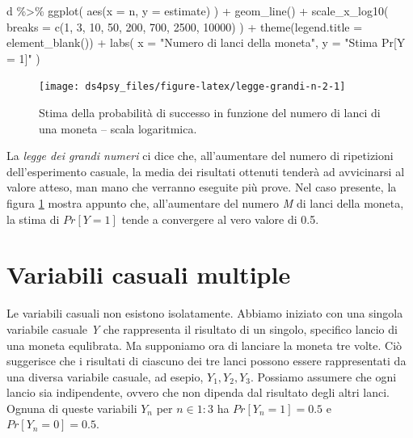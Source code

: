 \documentclass[
  11pt,
]{krantz}
\makeatletter
\newenvironment{Shaded}{\begin{snugshade}}{\end{snugshade}}
\newcommand{\AttributeTok}[1]{\textcolor[rgb]{0.61,0.61,0.61}{#1}}
\newcommand{\DecValTok}[1]{\textcolor[rgb]{0.06,0.06,0.06}{#1}}
\newcommand{\FunctionTok}[1]{\textcolor[rgb]{0,0,0}{#1}}
\newcommand{\NormalTok}[1]{#1}
\newcommand{\SpecialCharTok}[1]{\textcolor[rgb]{0,0,0}{#1}}
\newcommand{\StringTok}[1]{\textcolor[rgb]{0.5,0.5,0.5}{#1}}
\newenvironment{kframe}{%
\medskip{}
\setlength{\fboxsep}{.8em}
 \def\at@end@of@kframe{}%
 \ifinner\ifhmode%
  \def\at@end@of@kframe{\end{minipage}}%
  \begin{minipage}{\columnwidth}%
 \fi\fi%
 \def\FrameCommand##1{\hskip\@totalleftmargin \hskip-\fboxsep
 \colorbox{shadecolor}{##1}\hskip-\fboxsep
     \hskip-\linewidth \hskip-\@totalleftmargin \hskip\columnwidth}%
 \MakeFramed {\advance\hsize-\width
   \@totalleftmargin\z@ \linewidth\hsize
   \@setminipage}}%
 {\par\unskip\endMakeFramed%
 \at@end@of@kframe}
\renewenvironment{Shaded}{\begin{kframe}}{\end{kframe}}
\theoremstyle{definition}
\theoremstyle{definition}
\theoremstyle{definition}
\theoremstyle{definition}
\theoremstyle{remark}
\makeatother
\begin{document}
\begin{Shaded}
\begin{Highlighting}[]
\NormalTok{d }\SpecialCharTok{\%\textgreater{}\%} 
  \FunctionTok{ggplot}\NormalTok{(}
    \FunctionTok{aes}\NormalTok{(}\AttributeTok{x =}\NormalTok{ n, }\AttributeTok{y =}\NormalTok{ estimate)}
\NormalTok{  ) }\SpecialCharTok{+}
  \FunctionTok{geom\_line}\NormalTok{() }\SpecialCharTok{+}
  \FunctionTok{scale\_x\_log10}\NormalTok{(}
    \AttributeTok{breaks =} \FunctionTok{c}\NormalTok{(}\DecValTok{1}\NormalTok{, }\DecValTok{3}\NormalTok{, }\DecValTok{10}\NormalTok{, }\DecValTok{50}\NormalTok{, }\DecValTok{200}\NormalTok{, }
               \DecValTok{700}\NormalTok{, }\DecValTok{2500}\NormalTok{, }\DecValTok{10000}\NormalTok{)}
\NormalTok{  ) }\SpecialCharTok{+}
  \FunctionTok{theme}\NormalTok{(}\AttributeTok{legend.title =} \FunctionTok{element\_blank}\NormalTok{()) }\SpecialCharTok{+}
  \FunctionTok{labs}\NormalTok{(}
    \AttributeTok{x =} \StringTok{"Numero di lanci della moneta"}\NormalTok{, }
    \AttributeTok{y =} \StringTok{"Stima Pr[Y = 1]"}
\NormalTok{)}
\end{Highlighting}
\end{Shaded}

\begin{figure}[h]

{\centering \texttt{[image: ds4psy\_files/figure-latex/legge-grandi-n-2-1]} 

}

\caption{Stima della probabilità di successo in funzione del numero di lanci di una moneta -- scala logaritmica.}\label{fig:legge-grandi-n-2}
\end{figure}

La \emph{legge dei grandi numeri} ci dice che, all'aumentare del numero di ripetizioni dell'esperimento casuale, la media dei risultati ottenuti tenderà ad avvicinarsi al valore atteso, man mano che verranno eseguite più prove. Nel caso presente, la figura \ref{fig:legge-grandi-n-2} mostra appunto che, all'aumentare del numero \emph{M} di lanci della moneta, la stima di \(Pr[Y = 1]\) tende a convergere al vero valore di 0.5.

\hypertarget{variabili-casuali-multiple}{%
\section{Variabili casuali multiple}\label{variabili-casuali-multiple}}

Le variabili casuali non esistono isolatamente. Abbiamo iniziato con una singola variabile casuale \emph{Y} che rappresenta il risultato di un singolo, specifico lancio di una moneta equlibrata. Ma supponiamo ora di lanciare la moneta tre volte. Ciò suggerisce che i risultati di ciascuno dei tre lanci possono essere rappresentati da una diversa variabile casuale, ad esepio, \(Y_1 , Y_2 , Y_3\). Possiamo assumere che ogni lancio sia indipendente, ovvero che non dipenda dal risultato degli altri lanci. Ognuna di queste variabili \(Y_n\) per \(n \in 1:3\) ha \(Pr[Y_n =1]=0.5\) e \(Pr[Y_n =0]=0.5\).
\end{document}
